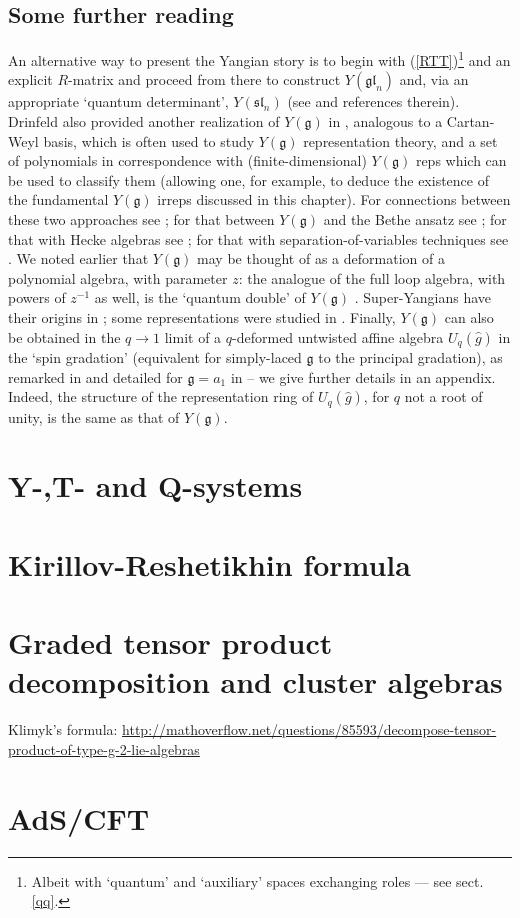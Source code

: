\documentclass[12pt]{article}
\newcommand{\gf}{\mathfrak{g}}
\begin{document}
\subsection{Some further reading}

An alternative way to present the Yangian story is to begin with
(\ref{RTT})\footnote{Albeit with `quantum' and `auxiliary' spaces
exchanging roles --- see sect.\ref{qq}.} and an explicit
$R$-matrix and proceed from there to construct
$Y({\mathfrak{gl}}_n)$ and, via an appropriate `quantum
determinant', $Y({\mathfrak{sl}}_n)$ (see \cite{molev} and
references therein). Drinfeld also provided another realization of
$Y(\gf)$ in \cite{drinf87}, analogous to a Cartan-Weyl basis, which
is often used to study $Y(\gf)$ representation theory, and a set of
polynomials in correspondence with (finite-dimensional) $Y(\gf)$
reps which can be used to classify them (allowing one, for
example, to deduce the existence of the fundamental $Y(\gf)$ irreps
discussed in this chapter). For connections between these two
approaches see \cite{crampe}; for that between $Y(\gf)$ and the
Bethe ansatz see \cite{KR,KS}; for that with Hecke algebras see
\cite{cher,drinf86}; for that with separation-of-variables
techniques see \cite{skly}. We noted earlier that $Y(\gf)$ may be
thought of as a deformation of a polynomial algebra, with
parameter $z$: the analogue of the full loop algebra, with powers
of $z^{-1}$ as well, is the `quantum double' of $Y(\gf)$
\cite{Ydouble1,Ydouble2}. Super-Yangians have their origins in
\cite{nazsuper}; some representations were studied in
\cite{RBZhang}. Finally, $Y(\gf)$ can also be obtained in the
$q\rightarrow 1$ limit of a $q$-deformed untwisted affine algebra
$U_q(\hat{g})$ in the `spin gradation' (equivalent for
simply-laced $\gf$ to the principal gradation), as remarked in
\cite{drinf1,CPbook} and detailed for $\gf=a_1$ in \cite{BL2} -- we
give further details in an appendix. Indeed, the structure of the
representation ring of $U_q(\hat{g})$, for $q$ not a root of
unity, is the same as that of $Y(\gf)$.

\section{Y-,T- and Q-systems}
\label{sec:y-t-q}

\section{Kirillov-Reshetikhin formula}
\label{sec:kirill-resh-form}

\section{Graded tensor product decomposition and cluster algebras }
\label{sec:grad-tens-prod}

Klimyk's formula: \url{http://mathoverflow.net/questions/85593/decompose-tensor-product-of-type-g-2-lie-algebras}

\section{AdS/CFT}
\label{sec:adscft}
\end{document}
